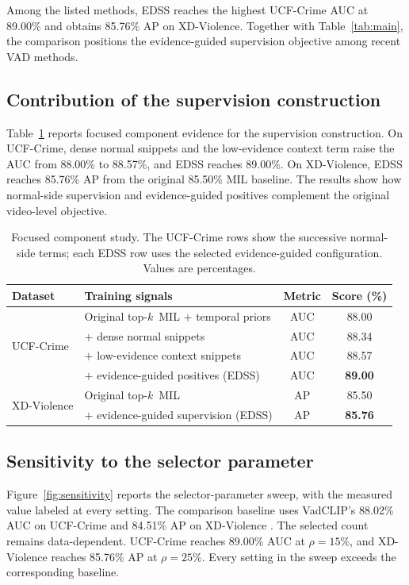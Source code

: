 \documentclass[preprint,12pt]{elsarticle}
\newcommand{\topk}{top-$k$\ }
\begin{document}
Among the listed methods, EDSS reaches the highest UCF-Crime AUC at 89.00\% and obtains 85.76\% AP on XD-Violence. Together with Table~\ref{tab:main}, the comparison positions the evidence-guided supervision objective among recent VAD methods.

\subsection{Contribution of the supervision construction}
Table~\ref{tab:ablation} reports focused component evidence for the supervision construction. On UCF-Crime, dense normal snippets and the low-evidence context term raise the AUC from 88.00\% to 88.57\%, and EDSS reaches 89.00\%. On XD-Violence, EDSS reaches 85.76\% AP from the original 85.50\% MIL baseline. The results show how normal-side supervision and evidence-guided positives complement the original video-level objective.

\begin{table}[t]
\centering
\caption{Focused component study. The UCF-Crime rows show the successive normal-side terms; each EDSS row uses the selected evidence-guided configuration. Values are percentages.}
\label{tab:ablation}
\small
\begin{tabular}{llcc}
\toprule
Dataset & Training signals & Metric & Score (\%) \\
\midrule
\multirow{4}{*}{UCF-Crime}
 & Original \topk MIL + temporal priors & AUC & 88.00 \\
 & $+$ dense normal snippets & AUC & 88.34 \\
 & $+$ low-evidence context snippets & AUC & 88.57 \\
 & $+$ evidence-guided positives (EDSS) & AUC & \textbf{89.00} \\
\midrule
\multirow{2}{*}{XD-Violence}
 & Original \topk MIL & AP & 85.50 \\
 & $+$ evidence-guided supervision (EDSS) & AP & \textbf{85.76} \\
\bottomrule
\end{tabular}
\end{table}

\subsection{Sensitivity to the selector parameter}
Figure~\ref{fig:sensitivity} reports the selector-parameter sweep, with the measured value labeled at every setting. The comparison baseline uses VadCLIP's 88.02\% AUC on UCF-Crime and 84.51\% AP on XD-Violence \citep{vadclip2024}. The selected count remains data-dependent. UCF-Crime reaches 89.00\% AUC at $\rho=15\%$, and XD-Violence reaches 85.76\% AP at $\rho=25\%$. Every setting in the sweep exceeds the corresponding baseline.
\end{document}
